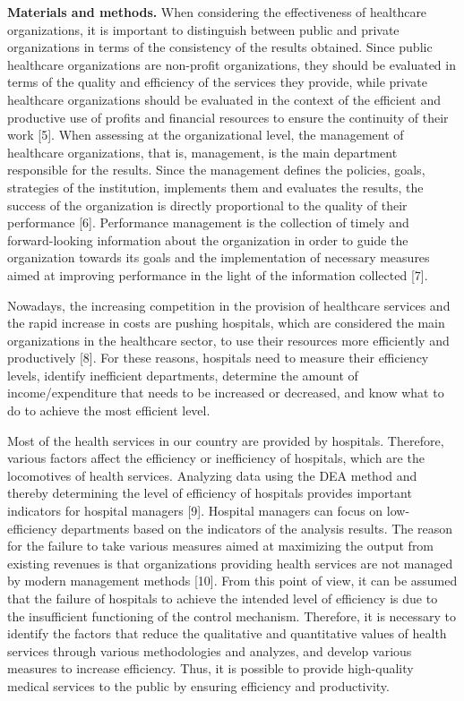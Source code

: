 {\bfseries Materials and methods.} When considering the effectiveness of
healthcare organizations, it is important to distinguish between public
and private organizations in terms of the consistency of the results
obtained. Since public healthcare organizations are non-profit
organizations, they should be evaluated in terms of the quality and
efficiency of the services they provide, while private healthcare
organizations should be evaluated in the context of the efficient and
productive use of profits and financial resources to ensure the
continuity of their work {[}5{]}. When assessing at the organizational
level, the management of healthcare organizations, that is, management,
is the main department responsible for the results. Since the management
defines the policies, goals, strategies of the institution, implements
them and evaluates the results, the success of the organization is
directly proportional to the quality of their performance {[}6{]}.
Performance management is the collection of timely and forward-looking
information about the organization in order to guide the organization
towards its goals and the implementation of necessary measures aimed at
improving performance in the light of the information collected {[}7{]}.

Nowadays, the increasing competition in the provision of healthcare
services and the rapid increase in costs are pushing hospitals, which
are considered the main organizations in the healthcare sector, to use
their resources more efficiently and productively {[}8{]}. For these
reasons, hospitals need to measure their efficiency levels, identify
inefficient departments, determine the amount of income/expenditure that
needs to be increased or decreased, and know what to do to achieve the
most efficient level.

Most of the health services in our country are provided by hospitals.
Therefore, various factors affect the efficiency or inefficiency of
hospitals, which are the locomotives of health services. Analyzing data
using the DEA method and thereby determining the level of efficiency of
hospitals provides important indicators for hospital managers {[}9{]}.
Hospital managers can focus on low-efficiency departments based on the
indicators of the analysis results. The reason for the failure to take
various measures aimed at maximizing the output from existing revenues
is that organizations providing health services are not managed by
modern management methods {[}10{]}. From this point of view, it can be
assumed that the failure of hospitals to achieve the intended level of
efficiency is due to the insufficient functioning of the control
mechanism. Therefore, it is necessary to identify the factors that
reduce the qualitative and quantitative values
\hspace{0pt}\hspace{0pt}of health services through various methodologies
and analyzes, and develop various measures to increase efficiency. Thus,
it is possible to provide high-quality medical services to the public by
ensuring efficiency and productivity.

